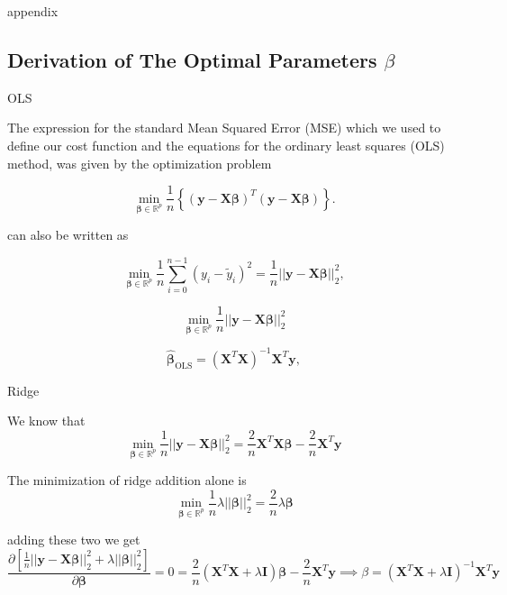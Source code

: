 \documentclass[twoside,11pt]{report}
\begin{document}
appendix



%
\subsection*{Derivation of The Optimal Parameters $\beta$}
\label{app:OptimalBeta}

OLS

The expression for the standard Mean Squared Error (MSE) which we used to define our cost function and the equations for the ordinary least squares (OLS) method, was given by the
optimization problem


$$
{\displaystyle \min_{\mathbf{\beta}\in {\mathbb{R}}^{p}}}\frac{1}{n}\left\{\left(\mathbf{y}-\mathbf{X}\mathbf{\beta}\right)^T\left(\mathbf{y}-\mathbf{X}\mathbf{\beta}\right)\right\}.
$$

can also be written as 

$$
{\displaystyle \min_{\mathbf{\beta}\in
{\mathbb{R}}^{p}}}\frac{1}{n}\sum_{i=0}^{n-1}\left(y_i-\tilde{y}_i\right)^2=\frac{1}{n}\vert\vert \mathbf{y}-\mathbf{X}\mathbf{\beta}\vert\vert_2^2,
$$


$$
{\displaystyle \min_{\mathbf{\beta}\in
{\mathbb{R}}^{p}}}\frac{1}{n}\vert\vert \mathbf{y}-\mathbf{X}\mathbf{\beta}\vert\vert_2^2
$$


$$
\hat{\mathbf{\beta}}_{\mathrm{OLS}} = \left(\mathbf{X}^T\mathbf{X}\right)^{-1}\mathbf{X}^T\mathbf{y},
$$



Ridge



We know that 
$$
{\displaystyle \min_{\mathbf{\beta}\in
{\mathbb{R}}^{p}}}\frac{1}{n} \vert\vert\mathbf{y}- \mathbf{X}\mathbf{\beta}\vert\vert_2^2 = \frac{2}{n} \mathbf{X}^T\mathbf{X}\mathbf{\beta}-\frac{2}{n}\mathbf{X}^T\mathbf{y}
$$

The minimization of ridge addition alone is
$${\displaystyle \min_{\mathbf{\beta}\in
{\mathbb{R}}^{p}}}\frac{1}{n} \lambda \vert\vert \mathbf{\beta}\vert\vert_2^2 = \frac{2}{n} \lambda \mathbf{\beta}
$$

adding these two we get
$$
    \frac{\partial \left[\frac{1}{n}\vert\vert \mathbf{y}-\mathbf{X}\mathbf{\beta}\vert\vert_2^2+\lambda\vert\vert \mathbf{\beta}\vert\vert_2^2\right]}
    {\partial{\mathbf{\beta}}} = 0 
    = \frac{2}{n}\left(\mathbf{X}^T\mathbf{X}+\lambda\mathbf{I}\right)
    \mathbf{\beta}-\frac{2}{n}\mathbf{X}^T\mathbf{y} \implies \beta = \left(\mathbf{X}^T\mathbf{X}+\lambda\mathbf{I}\right)^{-1}\mathbf{X}^T\mathbf{y}
$$
\end{document}
